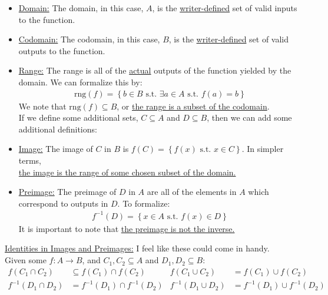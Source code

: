 \documentclass{article}
\newcommand{\suchthat}{\textrm{ s.t. }}
\newcommand{\sheader}[1]{\underline{#1:}}
\newcommand{\curly}[1]{\left\{#1\right\}}
\newcommand{\sgap}{\smallskip\\}
\begin{document}
\begin{itemize}
    \item \sheader{Domain} The domain, in this case, $A$, is the \underline{writer-defined}
    set of valid inputs to the function.
    \item \sheader{Codomain} The codomain, in this case, $B$, is the \underline{writer-defined}
    set of valid outputs to the function.
    \item \sheader{Range} The range is all of the \underline{actual} outputs of the 
    function yielded by the domain. We can formalize this by:
    \begin{align*}
        \textrm{rng}(f) = \curly{b \in B \suchthat \exists a \in A \suchthat f(a) = b}
    \end{align*}
    We note that $\textrm{rng}(f) \subseteq B$, or \underline{the range is a subset of the codomain}.
    \sgap
    If we define some additional sets, $C \subseteq A$ and $D \subseteq B$, then we 
    can add some additional definitions:
    \item \sheader{Image} The image of $C$ in $B$ is $f(C) = \curly{f(x) \suchthat x \in C}$.
    In simpler terms, \\\underline{the image is the range of some chosen subset of the domain.}
    \item \sheader{Preimage} The preimage of $D$ in $A$ are all of the elements in $A$ 
    which correspond to outputs in $D$. To formalize:
    \begin{align*}
        f^{-1}(D) = \curly{x \in A \suchthat f(x) \in D}
    \end{align*}
    It is important to note that \underline{the preimage is not the inverse.}
\end{itemize}
\sheader{Identities in Images and Preimages} I feel like these could come in handy.
\sgap
Given some $f: A \to B$, and $C_1, C_2 \subseteq A$ and $D_1, D_2 \subseteq B$:
\begin{align*}
    f(C_1 \cap C_2) &\subseteq f(C_1) \cap f(C_2) & f(C_1 \cup C_2) &= f(C_1) \cup f(C_2)\\
    f^{-1}(D_1 \cap D_2) &= f^{-1}(D_1) \cap f^{-1}(D_2) & f^{-1}(D_1 \cup D_2) &= f^{-1}(D_1) \cup f^{-1}(D_2)
\end{align*}
\pagebreak
\end{document}
